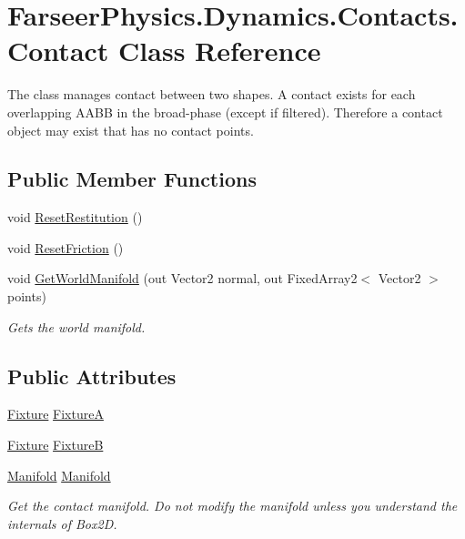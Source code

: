 \hypertarget{class_farseer_physics_1_1_dynamics_1_1_contacts_1_1_contact}{\section{Farseer\+Physics.\+Dynamics.\+Contacts.\+Contact Class Reference}
\label{class_farseer_physics_1_1_dynamics_1_1_contacts_1_1_contact}
}


The class manages contact between two shapes. A contact exists for each overlapping A\+A\+B\+B in the broad-\/phase (except if filtered). Therefore a contact object may exist that has no contact points.  


\subsection*{Public Member Functions}
\begin{DoxyCompactItemize}
\item 
void \hyperlink{class_farseer_physics_1_1_dynamics_1_1_contacts_1_1_contact_a08c917dc7f7d480b8985b1b9e9256974}{Reset\+Restitution} ()
\item 
void \hyperlink{class_farseer_physics_1_1_dynamics_1_1_contacts_1_1_contact_a20661788ccd4c0dab8cf6dad7e014b06}{Reset\+Friction} ()
\item 
void \hyperlink{class_farseer_physics_1_1_dynamics_1_1_contacts_1_1_contact_a12a9f693680bc9f66ec47de823eb6a78}{Get\+World\+Manifold} (out Vector2 normal, out Fixed\+Array2$<$ Vector2 $>$ points)
\begin{DoxyCompactList}\small\item\em Gets the world manifold. \end{DoxyCompactList}\end{DoxyCompactItemize}
\subsection*{Public Attributes}
\begin{DoxyCompactItemize}
\item 
\hyperlink{class_farseer_physics_1_1_dynamics_1_1_fixture}{Fixture} \hyperlink{class_farseer_physics_1_1_dynamics_1_1_contacts_1_1_contact_a0da9032d4e7836b113256795fd67d257}{Fixture\+A}
\item 
\hyperlink{class_farseer_physics_1_1_dynamics_1_1_fixture}{Fixture} \hyperlink{class_farseer_physics_1_1_dynamics_1_1_contacts_1_1_contact_a297c1856a9d01d0a8fcd66c61db2d666}{Fixture\+B}
\item 
\hyperlink{struct_farseer_physics_1_1_collision_1_1_manifold}{Manifold} \hyperlink{class_farseer_physics_1_1_dynamics_1_1_contacts_1_1_contact_af602a35a9f73751b1bbbe811fdec5e3f}{Manifold}
\begin{DoxyCompactList}\small\item\em Get the contact manifold. Do not modify the manifold unless you understand the internals of Box2\+D. \end{DoxyCompactList}\end{DoxyCompactItemize}

